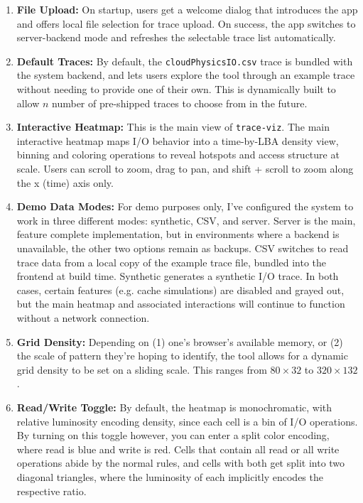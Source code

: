 \documentclass[11pt]{article}
\begin{document}
\begin{enumerate}
    \item \textbf{File Upload:} On startup, users get a welcome dialog that introduces the app and offers local file selection for trace upload.  On success, the app switches to server-backend mode and refreshes the selectable trace list automatically.
    \item \textbf{Default Traces:} By default, the \texttt{cloudPhysicsIO.csv} trace is bundled with the system backend, and lets users explore the tool through an example trace without needing to provide one of their own.  This is dynamically built to allow $n$ number of pre-shipped traces to choose from in the future.
    \item \textbf{Interactive Heatmap:} This is the main view of \texttt{trace-viz}.  The main interactive heatmap maps I/O behavior into a time-by-LBA density view, binning and coloring operations to reveal hotspots and access structure at scale.  Users can scroll to zoom, drag to pan, and shift + scroll to zoom along the x (time) axis only.
    \item \textbf{Demo Data Modes:} For demo purposes only, I've configured the system to work in three different modes: synthetic, CSV, and server.  Server is the main, feature complete implementation, but in environments where a backend is unavailable, the other two options remain as backups.  CSV switches to read trace data from a local copy of the example trace file, bundled into the frontend at build time.  Synthetic generates a synthetic I/O trace.  In both cases, certain features (e.g. cache simulations) are disabled and grayed out, but the main heatmap and associated interactions will continue to function without a network connection.
    \item \textbf{Grid Density:} Depending on (1) one's browser's available memory, or (2) the scale of pattern they're hoping to identify, the tool allows for a dynamic grid density to be set on a sliding scale.  This ranges from $80\times32$ to $320\times132$.
    \item \textbf{Read/Write Toggle:} By default, the heatmap is monochromatic, with relative luminosity encoding density, since each cell is a bin of I/O operations.  By turning on this toggle however, you can enter a split color encoding, where read is blue and write is red.  Cells that contain all read or all write operations abide by the normal rules, and cells with both get split into two diagonal triangles, where the luminosity of each implicitly encodes the respective ratio.

\end{enumerate}
\end{document}
